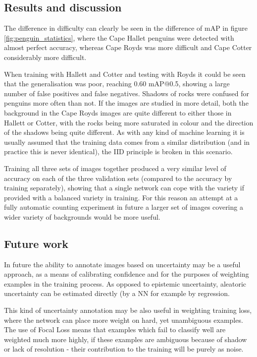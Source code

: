 \subsection{Results and discussion}
 
The difference in difficulty can clearly be seen in the difference of mAP in figure \ref{fig:penguin_statistics}, where the Cape Hallet penguins were detected with almost perfect accuracy, whereas Cape Royds was more difficult and Cape Cotter considerably more difficult. 

When training with Hallett and Cotter and testing with Royds it could be seen that the generalisation was poor, reaching $0.60$ mAP@0.5, showing a large number of false positives and false negatives. Shadows of rocks were confused for penguins more often than not. If the images are studied in more detail, both the background in the Cape Royds images are quite different to either those in Hallett or Cotter, with the rocks being more saturated in colour and the direction of the shadows being quite different. As with any kind of machine learning it is usually assumed that the training data comes from a similar distribution (and in practice this is never identical), the \gls{IID} principle is broken in this scenario. 

Training all three sets of images together produced a very similar level of accuracy on each of the three validation sets (compared to the accuracy by training separately), showing that a single network can cope with the variety if provided with a balanced variety in training. For this reason an attempt at a fully automatic counting experiment in future a larger set of images covering a wider variety of backgrounds would be more useful. 

\subsection{Future work}

In future the ability to annotate images based on uncertainty may be a useful approach, as a means of calibrating confidence and for the purposes of weighting examples in the training process. As opposed to epistemic uncertainty, aleatoric uncertainty can be estimated directly (by a \gls{NN} for example by regression.  

This kind of uncertainty annotation may be also useful in weighting training loss, where the network can place more weight on hard, yet unambiguous examples. The use of Focal Loss means that examples which fail to classify well are weighted much more highly, if these examples are ambiguous because of shadow or lack of resolution - their contribution to the training will be purely as noise.

